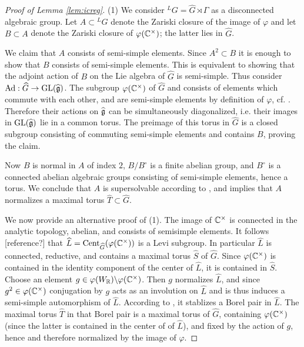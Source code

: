 \documentclass{article}
\theoremstyle{definition}
\numberwithin{equation}{section}
\renewcommand{\-}{\hyp{}}
\newcommand{\warn}[1]{{\leavevmode\color{red}[#1]}}
\newcommand{\Cent}{\mathrm{Cent}}
\begin{document}
\begin{proof}[Proof of Lemma \ref{lem:icreg}]
(1) We consider $^LG = \hat G \rtimes \Gamma$ as a disconnected algebraic group. Let $A \subset {^LG}$ denote the Zariski closure of the image of $\varphi$ and let $B \subset A$ denote the Zariski closure of $\varphi(\mathbb{C}^\times)$; the latter lies in $\hat G$. 

We claim that $A$ consists of semi-simple elements. Since $A^2 \subset B$ it is enough to show that $B$ consists of semi-simple elements. This is equivalent to showing that the adjoint action of $B$ on the Lie algebra of $\hat G$ is semi-simple. Thus consider $\textrm{Ad} : \widehat G \to \textrm{GL}(\mathfrak{\widehat g})$. The subgroup $\varphi(\mathbb{C}^\times)$ of $\hat G$ and consists of elements which commute with each other, and are semi-simple elements by definition of $\varphi$, cf. \cite[\S8]{BorCor}. Therefore their actions on $\mathfrak{\widehat g}$ can be simultaneously diagonalized, i.e. their images in $\textrm{GL}(\mathfrak{\widehat g})$ lie in a common torus. The preimage of this torus in $\hat G$ is a closed subgroup consisting of commuting semi-simple elements and contains $B$, proving the claim.

Now $B$ is normal in $A$ of index $2$, $B/B^\circ$ is a finite abelian group, and $B^\circ$ is a connected abelian algebraic groups consisting of semi-simple elements, hence a torus. We conclude that $A$ is supersolvable according to \cite[Definition 5.14]{SS70}, and \cite[Theorem 5.16]{SS70} implies that $A$ normalizes a maximal torus $\hat T \subset \hat G$.

We now provide an alternative proof of (1).
The image of $\mathbb{C}^\times$ is connected in the analytic topology, abelian, and consists of semisimple elements. It follows \warn{reference?} that $\hat L=\Cent_{\hat G}(\varphi(\C^\times))$ is a Levi subgroup.
In particular $\hat L$ is connected, reductive, and contains a maximal torus $\hat S$ of $\hat G$. Since $\varphi(\mathbb{C}^\times)$ is contained in the identity component of the center of $\hat L$, it is contained in $\hat S$.
Choose an element $g\in \varphi(W_{\mathbb{R}})\backslash \varphi(\mathbb{C}^\times)$. Then $g$ normalizes $\hat L$, and since $g^2\in \varphi(\mathbb{C}^\times)$ conjugation by $g$ acts as an involution on $\hat L$ and is thus induces a semi-simple automorphism of $\hat L$. According to \cite[Theorem 7.5]{Ste68end}, it stablizes a Borel pair in $\hat L$.
The maximal torus $\hat T$ in that Borel pair is a maximal torus of $\hat G$, containing $\varphi(\mathbb{C}^\times)$ (since the latter is contained in the center of of $\hat L$), and
fixed by the action of $g$, hence and therefore normalized by the image of $\varphi$.




\end{proof}
\end{document}
